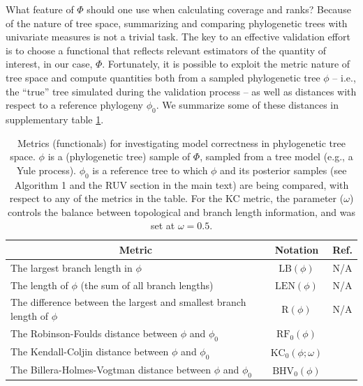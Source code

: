 \documentclass[oneside]{article}
\begin{document}
What feature of $\Phi$ should one use when calculating coverage and ranks?
Because of the nature of tree space, summarizing and comparing phylogenetic trees with univariate measures is not a trivial task.
The key to an effective validation effort is to choose a functional that reflects relevant estimators of the quantity of interest, in our case, $\Phi$.
Fortunately, it is possible to exploit the metric nature of tree space and compute quantities both from a sampled phylogenetic tree $\phi$ -- i.e., the ``true'' tree simulated during the validation process -- as well as distances with respect to a reference phylogeny $\phi_0$.
We summarize some of these distances in supplementary table \ref{suptab:dists}.

\begin{table}[h]
  \caption{Metrics (functionals) for investigating model correctness in phylogenetic tree space. $\phi$ is a (phylogenetic tree) sample of $\Phi$, sampled from a tree model (e.g., a Yule process).
  $\phi_0$ is a reference tree to which $\phi$ and its posterior samples (see Algorithm 1 and the RUV section in the main text) are being compared, with respect to any of the metrics in the table.
  For the KC metric, the parameter ($\omega$) controls the balance between topological and branch length information, and was set at $\omega = 0.5$. }
  \label{suptab:dists}
  \centering
  \begin{tabular}{ l|c|c }
    \hline
    \multicolumn{1}{c|}{Metric} & Notation & Ref. \\
    \hline  
    \rowcolor{gray!10}The largest branch length in $\phi$ & $\text{LB}(\phi)$ & N/A\\
    The length of $\phi$ (the sum of all branch lengths) & $\text{LEN}(\phi)$ & N/A\\
    \rowcolor{gray!10}The difference between the largest and smallest branch length of $\phi$ & $\text{R}(\phi)$ & N/A\\
    The Robinson-Foulds distance between $\phi$ and $\phi_0$ & $\text{RF}_0(\phi)$ & \citep{rf81}\\
    \rowcolor{gray!10}The Kendall-Coljin distance between $\phi$ and $\phi_0$ & $\text{KC}_0(\phi;\omega)$ & \citep{Kendall2016}\\
    The Billera-Holmes-Vogtman distance between $\phi$ and $\phi_0$ & $\text{BHV}_0(\phi)$ & \citep{Billera2001}\\
    \hline
  \end{tabular}
\end{table}
\end{document}
